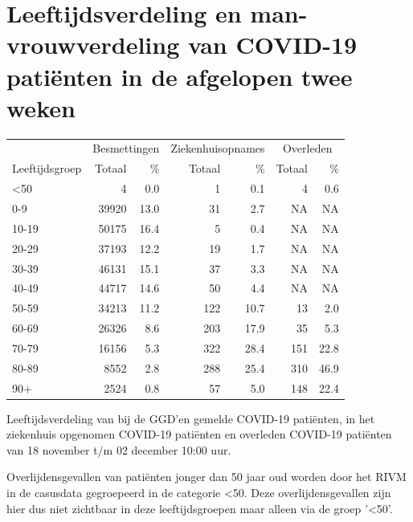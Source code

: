 \documentclass[
  english,
  man,floatsintext]{apa6}
\begin{document}
\hypertarget{leeftijdsverdeling-en-man-vrouwverdeling-van-covid-19-patiuxebnten-in-de-afgelopen-twee-weken}{%
\section{Leeftijdsverdeling en man-vrouwverdeling van COVID-19 patiënten in de afgelopen twee weken}\label{leeftijdsverdeling-en-man-vrouwverdeling-van-covid-19-patiuxebnten-in-de-afgelopen-twee-weken}}

\begin{table}
\centering\begingroup\fontsize{11}{13}\selectfont

\begin{threeparttable}
\begin{tabular}{lrrrrrr}
\toprule
\multicolumn{1}{c}{ } & \multicolumn{2}{c}{Besmettingen} & \multicolumn{2}{c}{Ziekenhuisopnames} & \multicolumn{2}{c}{Overleden} \\
\cmidrule(l{3pt}r{3pt}){2-3} \cmidrule(l{3pt}r{3pt}){4-5} \cmidrule(l{3pt}r{3pt}){6-7}
Leeftijdsgroep & Totaal & \% & Totaal & \% & Totaal & \%\\
\midrule
<50 & 4 & 0.0 & 1 & 0.1 & 4 & 0.6\\
0-9 & 39920 & 13.0 & 31 & 2.7 & NA & NA\\
10-19 & 50175 & 16.4 & 5 & 0.4 & NA & NA\\
20-29 & 37193 & 12.2 & 19 & 1.7 & NA & NA\\
30-39 & 46131 & 15.1 & 37 & 3.3 & NA & NA\\
40-49 & 44717 & 14.6 & 50 & 4.4 & NA & NA\\
50-59 & 34213 & 11.2 & 122 & 10.7 & 13 & 2.0\\
60-69 & 26326 & 8.6 & 203 & 17.9 & 35 & 5.3\\
70-79 & 16156 & 5.3 & 322 & 28.4 & 151 & 22.8\\
80-89 & 8552 & 2.8 & 288 & 25.4 & 310 & 46.9\\
90+ & 2524 & 0.8 & 57 & 5.0 & 148 & 22.4\\
\bottomrule
\end{tabular}
\begin{tablenotes}
\item[1] Leeftijdsverdeling van bij de GGD’en gemelde COVID-19 patiënten, in het ziekenhuis opgenomen COVID-19 patiënten en overleden COVID-19 patiënten van 18 november t/m 02 december 10:00 uur.
\item[2] Overlijdensgevallen van patiënten jonger dan 50 jaar oud worden door het RIVM in de casusdata gegroepeerd in de categorie <50. Deze overlijdensgevallen zijn hier dus niet zichtbaar in deze leeftijdsgroepen maar alleen via de groep '<50'.
\end{tablenotes}
\end{threeparttable}
\endgroup{}
\end{table}
\end{document}
